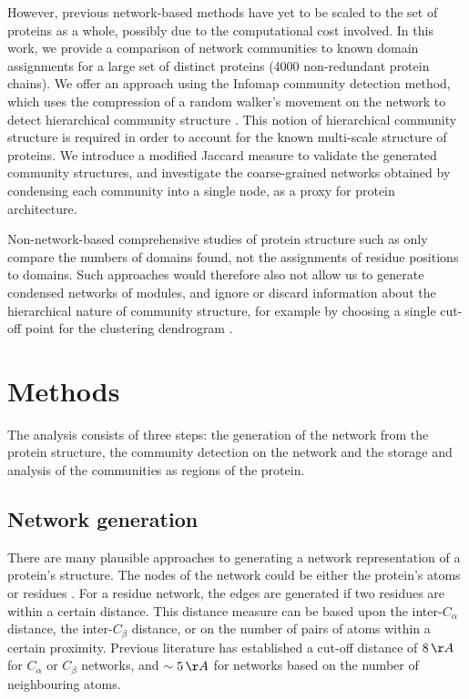 \documentclass[a4paper,numbib, final, twoside, titelpage]{imaiai}%
\begin{document}
However, previous network-based methods \cite{Tasdighian13, Hleap13} have yet to be scaled to the set of proteins as a whole, possibly due to the computational cost involved. In this work,  we provide a comparison of network communities to known domain assignments for a large set of distinct proteins (4000 non-redundant protein chains).  We offer an approach using the Infomap community detection method, which uses the compression of a random walker's movement on the network to detect hierarchical community structure \cite{Rosvall11}. This notion of hierarchical community structure is required in order to account for the known multi-scale structure of proteins. We introduce a modified Jaccard measure to validate the generated community structures, and investigate the coarse-grained networks obtained by condensing each community into a single node, as a proxy for protein architecture.

Non-network-based comprehensive studies of protein structure such as \cite{Feldman12} only compare the numbers of domains found, not the assignments of residue positions to domains. Such approaches would therefore also not allow us to generate condensed networks of modules, and ignore or discard information about the hierarchical nature of community structure, for example by choosing a single cut-off point for the clustering dendrogram \cite{Feldman12}.\vspace*{-2pt}

\section{Methods}
\label{sec:Methods}

The analysis consists of three steps: the generation of the network from the protein structure, the community detection on the network and the storage and analysis of the communities as regions of the protein.

\vspace*{-4pt}
\subsection{Network generation}

There are many plausible approaches to generating a network representation of a protein's structure. The nodes of the network could be either the protein's atoms \cite{Amor16} or residues \cite{Yan14}. For a residue network, the edges are generated if two residues are within a certain distance. This distance measure can be based upon the inter-$C_{\alpha}$ distance, the inter-$C_{\beta}$ distance, or on the number of pairs of atoms within a certain proximity. Previous literature \cite{Yan14,Chakraborty16_2} has established a cut-off distance of $8\,\AA$ for $C_{\alpha}$ or $C_{\beta}$ networks, and $\sim 5\,\AA$ for networks based on the number of neighbouring atoms.
\end{document}
